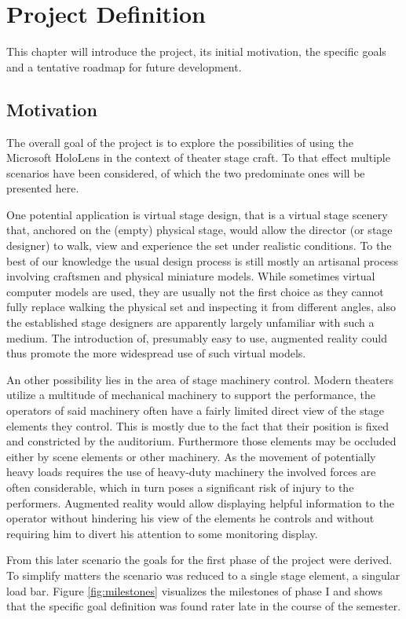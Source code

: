 \chapter{Project Definition}\label{sec:definition}
This chapter will introduce the project, its initial motivation, the specific goals and a tentative roadmap for future development.
\section{Motivation}\label{sec:motivation}
The overall goal of the project is to explore the possibilities of using the Microsoft HoloLens in the context of theater stage craft. To that effect multiple scenarios have been considered, of which the two predominate ones will be presented here.

One potential application is virtual stage design, that is a virtual stage scenery that, anchored on the (empty) physical stage, would allow the director (or stage designer) to walk, view and experience the set under realistic conditions. To the best of our knowledge the usual design process is still mostly an artisanal process involving craftsmen and physical miniature models. While sometimes virtual computer models are used, they are usually not the first choice as they cannot fully replace walking the physical set and inspecting it from different angles, also the established stage designers are apparently largely unfamiliar with such a medium. The introduction of, presumably easy to use, augmented reality could thus promote the more widespread use of such virtual models. 

An other possibility lies in the area of stage machinery control. Modern theaters utilize a multitude of mechanical machinery to support the performance, the operators of said machinery often have a fairly limited direct view of the stage elements they control. This is mostly due to the fact that their position is fixed and constricted by the auditorium. Furthermore those elements may be occluded either by scene elements or other machinery. As the movement of potentially heavy loads requires the use of heavy-duty machinery the involved forces are often considerable, which in turn poses a significant risk of injury to the performers. Augmented reality would allow displaying  helpful information to the operator without hindering his view of the elements he controls and without requiring him to divert his attention to some monitoring display.

From this later scenario the goals for the first phase of the project were derived. To simplify matters the scenario was reduced to a single stage element, a singular load bar. Figure \ref{fig:milestones} visualizes the milestones of phase I and shows that the specific goal definition was found rater late in the course of the semester.

